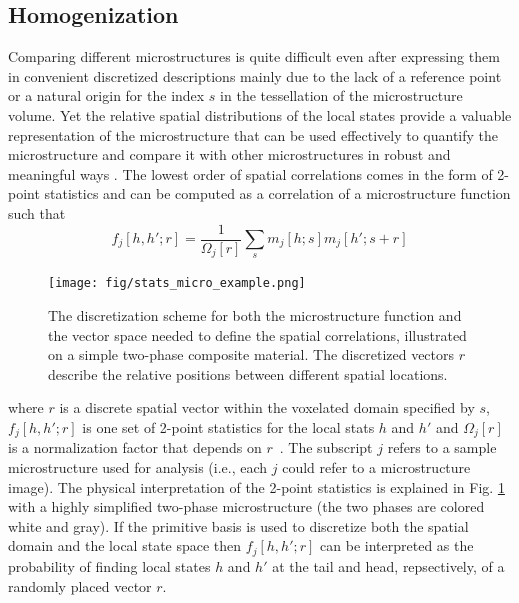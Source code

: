 \documentclass{bmcart}
\begin{document}
\subsection{Homogenization}

Comparing different microstructures is quite difficult even after
expressing them in convenient discretized descriptions mainly due to
the lack of a reference point or a natural origin for the index $s$ in
the tessellation of the microstructure volume. Yet the relative
spatial distributions of the local states provide a valuable
representation of the microstructure that can be used effectively to
quantify the microstructure and compare it with other microstructures
in robust and meaningful ways \cite{niezgoda2011understanding,
niezgoda2010optimized, niezgoda2013novel, cceccen2014data,
cecen2016versatile}. The lowest order of spatial correlations comes
in the form of 2-point statistics and can be computed as a correlation
of a microstructure function such that
\begin{equation}\label{eq:stats}
    f_j[h, h'; r] = \frac{1}{\Omega_j\left[r\right]}
    \sum_{s} m_j[h; s] m_j[h'; s +  r]
\end{equation}
\begin{figure}
    \centering
    \texttt{[image: fig/stats\_micro\_example.png]}
    \caption{The discretization scheme for both the microstructure function and the vector space needed to define the spatial correlations, illustrated on a simple two-phase composite material.
The discretized vectors $r$ describe the relative positions between different spatial locations.}
    \label{fig:stats}
\end{figure}
where $r$ is a discrete spatial vector within the voxelated domain
specified by $s$, $f_j[h, h'; r]$ is one set of 2-point statistics for
the local stats $h$ and $h'$ and $\Omega_j\left[r\right]$ is a
normalization factor that depends on
$r$~\cite{cecen2016versatile}. The subscript $j$ refers to a sample
microstructure used for analysis (i.e., each $j$ could refer to a
microstructure image). The physical interpretation of the 2-point
statistics is explained in Fig. \ref{fig:stats} with a highly
simplified two-phase microstructure (the two phases are colored white
and gray). If the primitive basis is used to discretize both the
spatial domain and the local state space then $f_j[h, h'; r]$ can be
interpreted as the probability of finding local states $h$ and $h'$ at
the tail and head, repsectively, of a randomly placed vector $r$.
\end{document}
